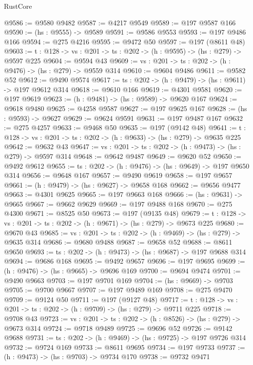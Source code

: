 \begin{lexlean}{RustCore}
\begin{coremodule}
@9586 := @9580 @9482
@9587 := @4217 @9549
@9589 := @197 @9587 @166
@9590 := (hs : @9555) -> @9589
@9591 := @9586 @9553
@9593 := @197 @9486 @166
@9594 := @275 @4216
@9595 := @9472 @50
@9597 := @197 (@8611 @48)
@9603 := {t : @128} -> {vs : @201} -> {ts : @202} -> (h : @9595) -> (hs : @279) -> @9597 @225
@9604 := @9594 @43
@9609 := {vs : @201} -> {ts : @202} -> (h : @9476) -> (hs : @279) -> @9559 @314
@9610 := @9604 @9486
@9611 := @9582 @52
@9612 := @9490 @9574
@9617 := {ts : @202} -> (h : @9479) -> (hs : @9611) -> @197 @9612 @314
@9618 := @9610 @166
@9619 := @4301 @9581
@9620 := @197 @9619
@9623 := (h : @9481) -> (hs : @9589) -> @9620 @167
@9624 := @9618 @9480
@9625 := @4258 @9587
@9627 := @197 @9625 @167
@9628 := (hs : @9593) -> @9627
@9629 := @9624 @9591
@9631 := @197 @9487 @167
@9632 := @275 @4257
@9633 := @9468 @50
@9635 := @197 (@9142 @48)
@9641 := {t : @128} -> {vs : @201} -> {ts : @202} -> (h : @9633) -> (hs : @279) -> @9635 @225
@9642 := @9632 @43
@9647 := {vs : @201} -> {ts : @202} -> (h : @9473) -> (hs : @279) -> @9597 @314
@9648 := @9642 @9487
@9649 := @9620 @52
@9650 := @9492 @9612
@9655 := {ts : @202} -> (h : @9476) -> (hs : @9649) -> @197 @9650 @314
@9656 := @9648 @167
@9657 := @9490 @9619
@9658 := @197 @9657
@9661 := (h : @9479) -> (hs : @9627) -> @9658 @168
@9662 := @9656 @9477
@9663 := @4301 @9625
@9665 := @197 @9663 @168
@9666 := (hs : @9631) -> @9665
@9667 := @9662 @9629
@9669 := @197 @9488 @168
@9670 := @275 @4300
@9671 := @8525 @50
@9673 := @197 (@9135 @48)
@9679 := {t : @128} -> {vs : @201} -> {ts : @202} -> (h : @9671) -> (hs : @279) -> @9673 @225
@9680 := @9670 @43
@9685 := {vs : @201} -> {ts : @202} -> (h : @9469) -> (hs : @279) -> @9635 @314
@9686 := @9680 @9488
@9687 := @9658 @52
@9688 := @8611 @9650
@9693 := {ts : @202} -> (h : @9473) -> (hs : @9687) -> @197 @9688 @314
@9694 := @9686 @168
@9695 := @9492 @9657
@9696 := @197 @9695
@9699 := (h : @9476) -> (hs : @9665) -> @9696 @169
@9700 := @9694 @9474
@9701 := @9490 @9663
@9703 := @197 @9701 @169
@9704 := (hs : @9669) -> @9703
@9705 := @9700 @9667
@9707 := @197 @9489 @169
@9708 := @275 @9470
@9709 := @9124 @50
@9711 := @197 (@9127 @48)
@9717 := {t : @128} -> {vs : @201} -> {ts : @202} -> (h : @9709) -> (hs : @279) -> @9711 @225
@9718 := @9708 @43
@9723 := {vs : @201} -> {ts : @202} -> (h : @8526) -> (hs : @279) -> @9673 @314
@9724 := @9718 @9489
@9725 := @9696 @52
@9726 := @9142 @9688
@9731 := {ts : @202} -> (h : @9469) -> (hs : @9725) -> @197 @9726 @314
@9732 := @9724 @169
@9733 := @8611 @9695
@9734 := @197 @9733
@9737 := (h : @9473) -> (hs : @9703) -> @9734 @170
@9738 := @9732 @9471

\end{coremodule}
\end{lexlean}
